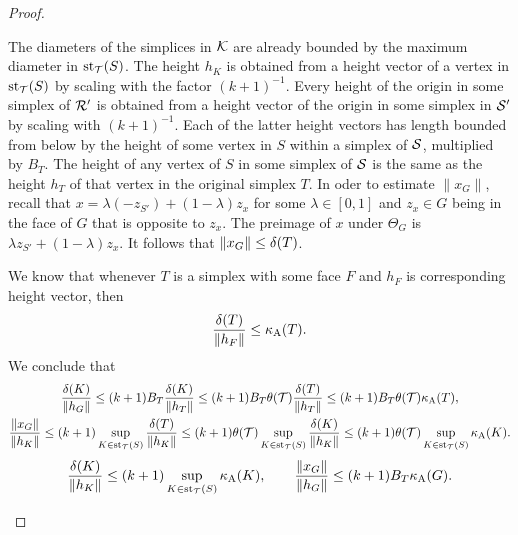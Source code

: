 \documentclass[10pt,letterpaper]{article}
\begin{document}
\begin{proof}
\begin{itemize}
        The diameters of the simplices in ${\mathcal K}$ are already bounded by the maximum diameter in $\operatorname{st}_{{\mathcal T}}(S)$.
        The height $h_{K}$ is obtained from a height vector of a vertex in $\operatorname{st}_{{\mathcal T}}(S)$ by scaling with the factor $(k+1)^{-1}$.
        Every height of the origin in some simplex of ${\mathcal R}'$ is obtained from a height vector of the origin in some simplex in ${\mathcal S}'$
        by scaling with $(k+1)^{-1}$. Each of the latter height vectors has length bounded from below by the height of some vertex in $S$ within a simplex of ${\mathcal S}$, multiplied by $B_{T}$. The height of any vertex of $S$ in some simplex of ${\mathcal S}$ is the same as the height $h_T$ of that vertex in the original simplex $T$. 
        In oder to estimate $\|x_{G}\|$, recall that $x = \lambda (-z_{S'}) + (1-\lambda) z_{x}$ for some $\lambda \in [0,1]$ and $z_{x} \in G$
        being in the face of $G$ that is opposite to $z_{x}$. The preimage of $x$ under $\Theta_{{G}}$ is $\lambda z_{S'} + (1-\lambda) z_{x}$. 
        It follows that $\|x_{G}\| \leq {\delta}(T)$. 
        
        We know that whenever $T$ is a simplex with some face $F$ and $h_F$ is corresponding height vector, then 
        \begin{align*}
            \frac{{\delta}(T)}{ \|h_{F}\|}
            \leq  
            \kappa_{{\rm A}}(T)
            .
        \end{align*}
        We conclude that 
        \begin{gather*}
            \frac{ \diam(K) }{ \| h_{{G}} \| }
            \leq 
            (k+1)B_{T}
            \frac{ \diam(K) }{ \| h_{T} \| }
            \leq 
            (k+1)B_{T}
            \theta(\calT)
            \frac{ \diam(T) }{ \| h_{T} \| }
            \leq 
            (k+1)B_{T}
            \theta(\calT)
            \kappa_{\maxcol}(T) %
            ,
            \\
            \frac{ \| x_{G} \| }{ \| h_{K} \| }
            \leq 
            (k+1)
            \sup_{ K \in \patch_{\calT}(S) }
            \frac{ \diam(T) }{ \| h_{K} \| }
            \leq 
            (k+1)
            \theta(\calT)
            \sup_{ K \in \patch_{\calT}(S) }
            \frac{ \diam(K) }{ \| h_{K} \| }
            \leq 
            (k+1)
            \theta(\calT)
            \sup_{ K \in \patch_{\calT}(S) }
            \kappa_{\maxcol}(K) %
            .
        \end{gather*}
        \begin{gather*}
            \frac{ \diam(K) }{ \| h_{{K}} \| }
            \leq 
            (k+1)
            \sup_{ K \in \patch_{\calT}(S) }
            \kappa_{\maxcol}(K) %
            ,
            \qquad 
            \frac{ \| x_{G} \| }{ \| h_{G} \| }
            \leq 
            (k+1)B_{T}
            \kappa_{\maxcol}({G}) %
            .
        \end{gather*}


\end{itemize}
\end{proof}
\end{document}
